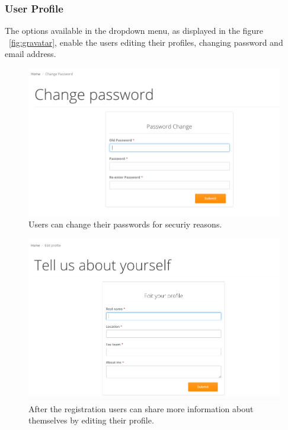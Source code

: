 \subsubsection*{User Profile}
The options available in the dropdown menu, as displayed in the figure ~\ref{fig:gravatar}, enable the users editing their profiles, changing password and email address. 

\begin{figure}[H]
	\begin{center}
		\includegraphics[width=.90\textwidth]{impl/images/changePassword}
		\caption{Users can change their passwords for securiy reasons.} \label{fig:changePassword}
	\end{center}
\end{figure}

\begin{figure}[H]
	\begin{center}
		\includegraphics[width=.90\textwidth]{impl/images/editProfile}
		\caption{After the registration users can share more information about themselves by editing their profile.} \label{fig:editprofile}
	\end{center}
\end{figure}

